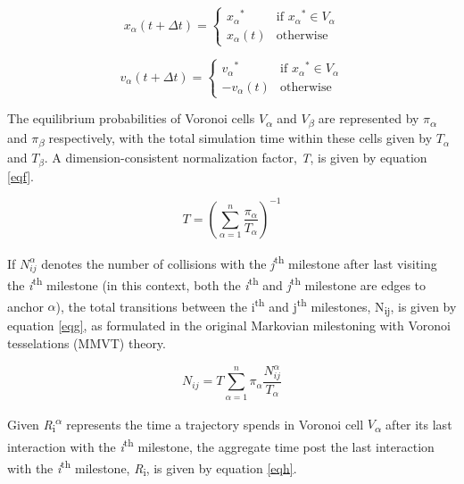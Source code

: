 \documentclass[9pt,training,pubversion]{livecoms}
\begin{document}
\begin{equation}
x_{\alpha}(t+\Delta t)=
\begin{cases}
{x_{\alpha}}^* & \text{if } {x_{\alpha}}^* \in V_{\alpha} \\
{x_{\alpha}}(t) & \text{otherwise}
\end{cases}
\label{eqd}
\end{equation}

\begin{equation}
v_{\alpha}(t+\Delta t)=
\begin{cases}
{v_{\alpha}}^* & \text{if } {x_{\alpha}}^* \in V_{\alpha} \\
-{v_{\alpha}}(t) & \text{otherwise}
\end{cases}
\label{eqe}
\end{equation}

\noindent The equilibrium probabilities of Voronoi cells $V$\textsubscript{$\alpha$} and $V$\textsubscript{$\beta$} are represented by $\pi$\textsubscript{$\alpha$} and $\pi$\textsubscript{$\beta$} respectively, with the total simulation time within these cells given by $T_{\alpha}$ and $T_{\beta}$. A dimension-consistent normalization factor, \textit{T}, is given by equation \ref{eqf}.

\begin{equation}
T = \left(\sum_{\alpha=1}^{n} \frac{{\pi_{\alpha}}}{{T_{\alpha}}}\right)^{-1}
\label{eqf}
\end{equation}

\noindent If $N_{ij}^{\alpha}$ denotes the number of collisions with the \textit{j}\textsuperscript{th} milestone after last visiting the \textit{i}\textsuperscript{th} milestone (in this context, both the \textit{i}\textsuperscript{th} and \textit{j}\textsuperscript{th} milestone are edges to anchor $\alpha$), the total transitions between the  i\textsuperscript{th} and j\textsuperscript{th} milestones, N\textsubscript{ij}, is given by equation \ref{eqg}, as formulated in the original Markovian milestoning with Voronoi tesselations (MMVT) theory. \cite{vanden2008assumptions}

\begin{equation}
N_{ij} = T \sum_{\alpha=1}^{n} \pi_{\alpha} \frac{N_{ij}^{\alpha}}{T_{\alpha}}
\label{eqg}
\end{equation}

\noindent Given \textit{R}\textsubscript{i}\textsuperscript{$\alpha$} represents the time a trajectory spends in Voronoi cell $V$\textsubscript{$\alpha$} after its last interaction with the \textit{i}\textsuperscript{th} milestone, the aggregate time post the last interaction with the \textit{i}\textsuperscript{th} milestone, \textit{R}\textsubscript{i}, is given by equation \ref{eqh}.
\end{document}
